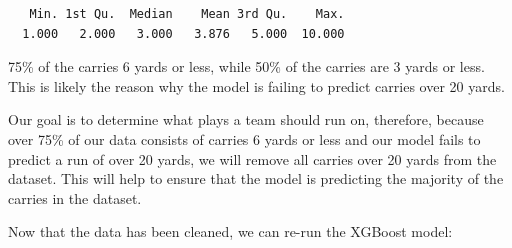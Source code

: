 \documentclass[
  super,
  preprint,
  3p]{elsarticle}
\newenvironment{Shaded}{\begin{snugshade}}{\end{snugshade}}
\newcommand{\CommentTok}[1]{\textcolor[rgb]{0.37,0.37,0.37}{#1}}
\newcommand{\ControlFlowTok}[1]{\textcolor[rgb]{0.00,0.23,0.31}{#1}}
\newcommand{\DecValTok}[1]{\textcolor[rgb]{0.68,0.00,0.00}{#1}}
\newcommand{\FloatTok}[1]{\textcolor[rgb]{0.68,0.00,0.00}{#1}}
\newcommand{\FunctionTok}[1]{\textcolor[rgb]{0.28,0.35,0.67}{#1}}
\newcommand{\NormalTok}[1]{\textcolor[rgb]{0.00,0.23,0.31}{#1}}
\newcommand{\OtherTok}[1]{\textcolor[rgb]{0.00,0.23,0.31}{#1}}
\newcommand{\SpecialCharTok}[1]{\textcolor[rgb]{0.37,0.37,0.37}{#1}}
\begin{document}
\begin{verbatim}
   Min. 1st Qu.  Median    Mean 3rd Qu.    Max. 
  1.000   2.000   3.000   3.876   5.000  10.000 
\end{verbatim}

75\% of the carries 6 yards or less, while 50\% of the carries are 3
yards or less. This is likely the reason why the model is failing to
predict carries over 20 yards.

Our goal is to determine what plays a team should run on, therefore,
because over 75\% of our data consists of carries 6 yards or less and
our model fails to predict a run of over 20 yards, we will remove all
carries over 20 yards from the dataset. This will help to ensure that
the model is predicting the majority of the carries in the dataset.

\begin{Shaded}
\end{Shaded}

Now that the data has been cleaned, we can re-run the XGBoost model:

\begin{Shaded}
\end{Shaded}
\end{document}
